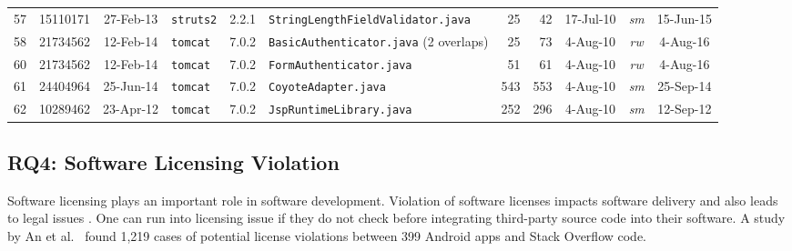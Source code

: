 \documentclass[sigconf,review, anonymous]{acmart}
\begin{document}
\begin{table}
{\begin{tabular}{r|l|c|l|c|p{5cm}|r|r|c|c|c}
			57 & 15110171 & 27-Feb-13 & \texttt{struts2} & 2.2.1  & \texttt{StringLengthFieldValidator.java}  & 25 & 42 & 17-Jul-10 & \textit{sm} & 15-Jun-15 \\
			58 & 21734562 & 12-Feb-14 & \texttt{tomcat} & 7.0.2  & \texttt{BasicAuthenticator.java} (2 overlaps) & 25 & 73 & 4-Aug-10 & \textit{rw} & 4-Aug-16 \\
			60 & 21734562 & 12-Feb-14 & \texttt{tomcat} & 7.0.2  & \texttt{FormAuthenticator.java}  & 51 & 61 & 4-Aug-10 & \textit{rw} & 4-Aug-16 \\
			61 & 24404964 & 25-Jun-14 & \texttt{tomcat} & 7.0.2  & \texttt{CoyoteAdapter.java}  & 543 & 553 & 4-Aug-10 & \textit{sm} & 25-Sep-14 \\
			62 & 10289462 & 23-Apr-12 & \texttt{tomcat} & 7.0.2  & \texttt{JspRuntimeLibrary.java}  & 252 & 296 & 4-Aug-10 & \textit{sm} & 12-Sep-12 \\
			\hline
	\end{tabular} %
}
\end{table}

\subsection{RQ4: Software Licensing Violation}
Software licensing plays an important role in software development. Violation of software licenses impacts software delivery and also leads to legal issues \cite{Sprigman2015}. 
One can run into licensing issue if they do not check before integrating third-party source code into their software. A study by An et al.~\cite{An2017} found 1,219 cases of potential license violations between 399 Android apps and Stack Overflow code. %
\end{document}
